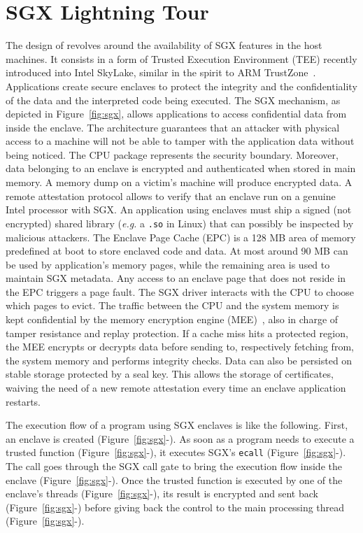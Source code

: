 \section{SGX Lightning Tour}
\label{sec:background}
The design of \SYS revolves around the availability of SGX features in the host machines. 
It consists in a form of Trusted Execution Environment (TEE) recently introduced into Intel SkyLake, similar in the spirit to ARM TrustZone~\cite{arm2009security}. 
Applications create secure enclaves to protect the integrity and the confidentiality of the data and the interpreted code being executed. 
The SGX mechanism, as depicted in Figure~\ref{fig:sgx}, allows applications to access confidential data from inside the enclave. 
The architecture guarantees that an attacker with physical access to a machine will not be able to tamper with the application data without being noticed. 
The CPU package represents the security boundary. 
Moreover, data belonging to an enclave is encrypted and authenticated when stored in main memory. 
A memory dump on a victim’s machine will produce encrypted data. 
A remote attestation protocol allows to verify that an enclave run on a genuine Intel processor with SGX. 
An application using enclaves must ship a signed (not encrypted) shared library (\emph{e.g.} a \texttt{.so} in Linux) that can possibly be inspected by malicious attackers. 
The Enclave Page Cache (EPC) is a 128 MB area of memory predefined at boot to store enclaved code and data. 
At most around 90 MB can be used by application’s memory pages, while the remaining area is used to maintain SGX metadata. 
Any access to an enclave page that does not reside in the EPC triggers a page fault. 
The SGX driver interacts with the CPU to choose which pages to evict. 
The traffic between the CPU and the system memory is kept confidential by the memory encryption engine (MEE)~\cite{gueron2016memory}, also in charge of tamper resistance and replay protection. 
If a cache miss hits a protected region, the MEE encrypts or decrypts data before sending to, respectively fetching from, the system memory and performs integrity checks. 
Data can also be persisted on stable storage protected by a seal key. 
This allows the storage of certificates, waiving the need of a new remote attestation every time an enclave application restarts.

The execution flow of a program using SGX enclaves is like the following.
First, an enclave is created (Figure~\ref{fig:sgx}-).
As soon as a program needs to execute a trusted function (Figure~\ref{fig:sgx}-), it executes SGX's \texttt{ecall} (Figure~\ref{fig:sgx}-).
The call goes through the SGX call gate to bring the execution flow inside the enclave (Figure~\ref{fig:sgx}-).
Once the trusted function is executed by one of the enclave's threads (Figure~\ref{fig:sgx}-), its result is encrypted and sent back (Figure~\ref{fig:sgx}-) before giving back the control to the main processing thread (Figure~\ref{fig:sgx}-).
